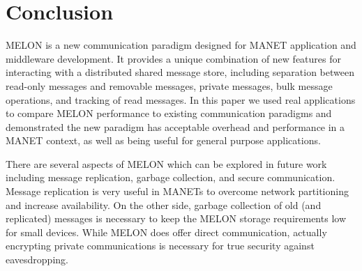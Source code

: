 \documentclass[lnicst]{svmultln}
\begin{document}
\section{Conclusion}\label{sec:conclusion}

MELON is a new communication paradigm designed for MANET application and middleware development. It provides a unique combination of new features for interacting with a distributed shared message store, including separation between read-only messages and removable messages, private messages, bulk message operations, and tracking of read messages. In this paper we used real applications to compare MELON performance to existing communication paradigms and demonstrated the new paradigm has acceptable overhead and performance in a MANET context, as well as being useful for general purpose applications.

There are several aspects of MELON which can be explored in future work including message replication, garbage collection, and secure communication. Message replication is very useful in MANETs to overcome network partitioning and increase availability. On the other side, garbage collection of old (and replicated) messages is necessary to keep the MELON storage requirements low for small devices. While MELON does offer direct communication, actually encrypting private communications is necessary for true security against eavesdropping.



\end{document}
